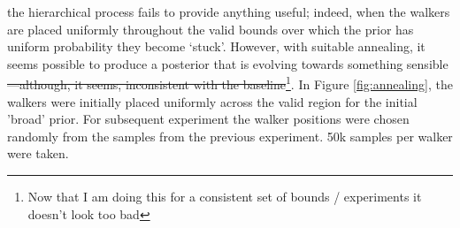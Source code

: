 \documentclass{tufte-handout}
\begin{document}
 the hierarchical process fails to
provide anything useful; indeed, when the walkers are placed uniformly
throughout the valid bounds over which the prior has uniform
probability they become `stuck'. However, with suitable annealing, it
seems possible to produce a posterior that is evolving towards
something sensible\sout{---although, it seems, inconsistent with the
baseline}\footnote{Now that I am doing this for a consistent set of bounds / experiments it doesn't look too bad}. In Figure \ref{fig:annealing}, the walkers were initially
placed uniformly across the valid region for the initial 'broad'
prior. For subsequent experiment the walker positions were chosen
randomly from the samples from the previous experiment. 50k samples per walker were taken.
\end{document}
